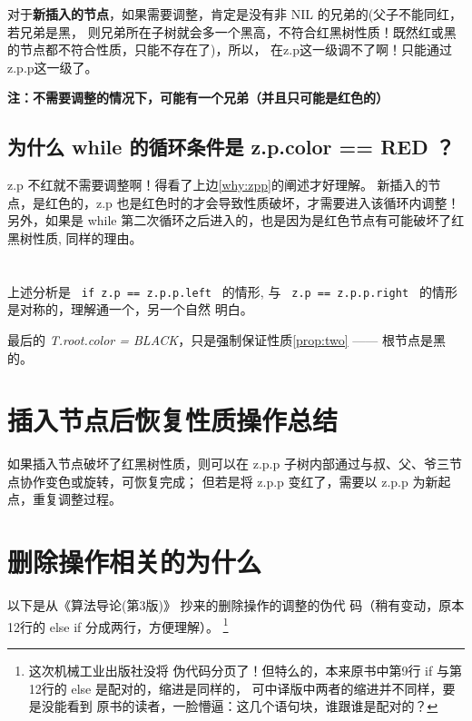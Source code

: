 \documentclass[a4paper, 11pt]{article}
\begin{document}
对于\textbf{新插入的节点}，如果需要调整，肯定是没有非 NIL 的兄弟的(父子不能同红，若兄弟是黑，
则兄弟所在子树就会多一个黑高，不符合红黑树性质！既然红或黑的节点都不符合性质，只能不存在了)，所以，
在z.p这一级调不了啊！只能通过 z.p.p这一级了。 \newline

\textbf{注：不需要调整的情况下，可能有一个兄弟（并且只可能是红色的）}

\subsection{为什么 while 的循环条件是 z.p.color == RED ？}
z.p 不红就不需要调整啊！得看了上边\ref{why:zpp}的阐述才好理解。
新插入的节点，是红色的，z.p 也是红色时的才会导致性质破坏，才需要进入该循环内调整！
另外，如果是 while 第二次循环之后进入的，也是因为是红色节点有可能破坏了红黑树性质, 同样的理由。

\section*{}
上述分析是 \verb| if z.p == z.p.p.left | 的情形, 与
\verb| z.p == z.p.p.right | 的情形是对称的，理解通一个，另一个自然
明白。 

最后的 \textit{T.root.color = BLACK}，只是强制保证性质\ref{prop:two} ------ 根节点是黑的。

\section{插入节点后恢复性质操作总结}
如果插入节点破坏了红黑树性质，则可以在 z.p.p 子树内部通过与叔、父、爷三节点协作变色或旋转，可恢复完成；
但若是将 z.p.p 变红了，需要以 z.p.p 为新起点，重复调整过程。

\section{删除操作相关的为什么}
以下是从《算法导论(第3版)》\cite{algorithm:intro} 抄来的删除操作的调整的伪代
码（稍有变动，原本12行的 else if 分成两行，方便理解）。
\footnote{这次机械工业出版社没将
伪代码分页了！但特么的，本来原书中第9行 if 与第12行的 else 是配对的，缩进是同样的，
可中译版中两者的缩进并不同样，要是没能看到
原书的读者，一脸懵逼：这几个语句块，谁跟谁是配对的？}
\end{document}
